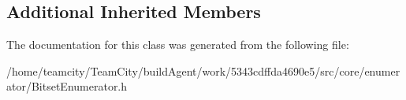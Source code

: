 \subsection*{Additional Inherited Members}


The documentation for this class was generated from the following file\+:\begin{DoxyCompactItemize}
\item 
/home/teamcity/\+Team\+City/build\+Agent/work/5343cdffda4690e5/src/core/enumerator/Bitset\+Enumerator.\+h\end{DoxyCompactItemize}
